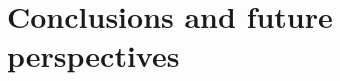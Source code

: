 \documentclass[../main.tex]{subfiles}
\begin{document}
\chapter{Conclusions and future perspectives}

\end{document}
